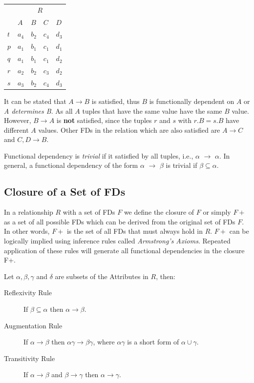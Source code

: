 \begin{center}
\begin{tabular}[h]{l|l|l|l|l|}
  \cline{2-5}
  & \multicolumn{4}{|c|}{$R$} \\ \cline{2-5}
  & $A$ & $B$ & $C$ & $D$ \\ \cline{2-5}
  $t$ & $a_4$ & $b_2$ & $c_4$ & $d_3$ \\ 
  $p$ & $a_1$ & $b_1$ & $c_1$ & $d_1$ \\ 
  $q$ & $a_1$ & $b_1$ & $c_1$ & $d_2$ \\ 
  $r$ & $a_2$ & $b_2$ & $c_3$ & $d_2$ \\ 
  $s$ & $a_3$ & $b_2$ & $c_4$ & $d_3$ \\ \cline{2-5}
\end{tabular}
\end{center}

It can be stated that $A \rightarrow B$  is satisfied, thus
$B$ is functionally dependent on $A$ or \textit{A determines B}.
As all $A$ tuples that have the same value have the same $B$ value. However,
$B \rightarrow A$ is \textbf{not} satisfied, since the tuples $r$ and $s$ with $r.B = s.B$ have
different $A$ values. Other FDs in the relation which are also satisfied are
$A \rightarrow C$ and $C, D \rightarrow B$.

Functional dependency is \textit{trivial} if it satisfied by all tuples, i.e., $\alpha$ $\rightarrow$ $\alpha$.
In general, a functional dependency of the form $\alpha$ $\rightarrow$ $\beta$ is trivial if 
$\beta \subseteq \alpha$.

\subsection{Closure of a Set of FDs}
In a relationship $R$ with a set of FDs $F$ we define the closure of $F$ or simply $F+$
as a set of all possible FDs which can be derived from the original set of FDs $F$. In 
other words, $F+$ is the set of all FDs that must always hold in $R$. $F+$ can be
logically implied using inference rules called \textit{Armstrong's Axioms}. 
Repeated application of these rules will generate all functional dependencies in the closure F+.

Let $\alpha, \beta, \gamma$ and $\delta$ are subsets of the Attributes in $R$, then:

\begin{description}
  \item[Reflexivity Rule] If $\beta \subseteq \alpha$ then $\alpha \rightarrow \beta$.
  \item[Augmentation Rule] If $\alpha \rightarrow \beta$ then $\alpha\gamma \rightarrow \beta\gamma$, where $\alpha\gamma$ is a short form of $\alpha \cup \gamma$.
  \item[Transitivity Rule] If $\alpha \rightarrow \beta$ and $\beta \rightarrow \gamma$ then $\alpha \rightarrow \gamma$.
\end{description}

